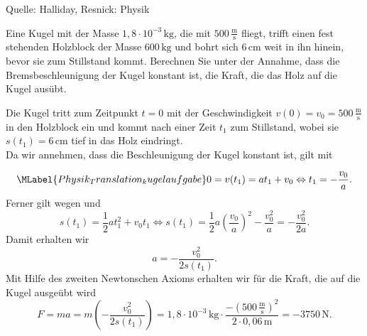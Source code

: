 \begin{MExercises}
\begin{MExercise}
               Quelle: Halliday, Resnick: Physik
               \end{MExercise}
               \begin{MExercise}
               Eine Kugel mit der Masse ${1,8}\cdot 10^{-3}\,\text{kg}$, die mit $500\,\frac{\text{m}}{\text{s}}$ fliegt, trifft einen fest stehenden Holzblock der Masse $600\,\text{kg}$ und bohrt sich $6\, \text{cm}$ weit in ihn hinein, bevor sie zum Stillstand kommt. Berechnen Sie unter der Annahme, dass die Bremsbeschleunigung der Kugel konstant ist, die Kraft, die das Holz auf die Kugel aus\"ubt.
               
               \begin{MSolution}
               Die Kugel tritt zum Zeitpunkt $t=0$ mit der Geschwindigkeit $v(0)=v_0=500\,\frac{\text{m}}{\text{s}}$ in den Holzblock ein und kommt nach einer Zeit $t_1$ zum Stillstand, wobei sie $s(t_1)=6\,\text{cm}$ tief in das Holz eindringt. \\
               
               Da wir annehmen, dass die Beschleunigung der Kugel konstant ist, gilt mit 
               
               \begin{equation}\MLabel{Physik_Translation_kugelaufgabe}
               0=v(t_1)=a t_1+v_0\Leftrightarrow t_1=-\frac{v_0}{a}.
               \end{equation} 
               Ferner gilt wegen  und 
               \begin{equation*}
               s(t_1)=\frac{1}{2}at_1^2+v_0t_1\Leftrightarrow s(t_1)=\frac{1}{2}a\left(\frac{v_0}{a}\right)^2-\frac{v_0^2}{a}=-\frac{v_0^2}{2a}.
               \end{equation*} Damit erhalten wir
               \begin{equation*}
               a=-\frac{v_0^2}{2s(t_1)}.
               \end{equation*} Mit Hilfe des zweiten Newtonschen Axioms erhalten wir f\"ur die Kraft, die auf die Kugel ausge\"ubt wird
               \begin{equation*}
               F=ma=m\left(-\frac{v_0^2}{2s(t_1)}\right)={1,8}\cdot 10^{-3}\,\text{kg}\cdot\frac{-\left(500\,\frac{\text{m}}{\text{s}}\right)^2}{2\cdot {0,06}\,\text{m}}=-3750\, \text{N}.
               \end{equation*}
               \end{MSolution}
               

\end{MExercise}
\end{MExercises}
